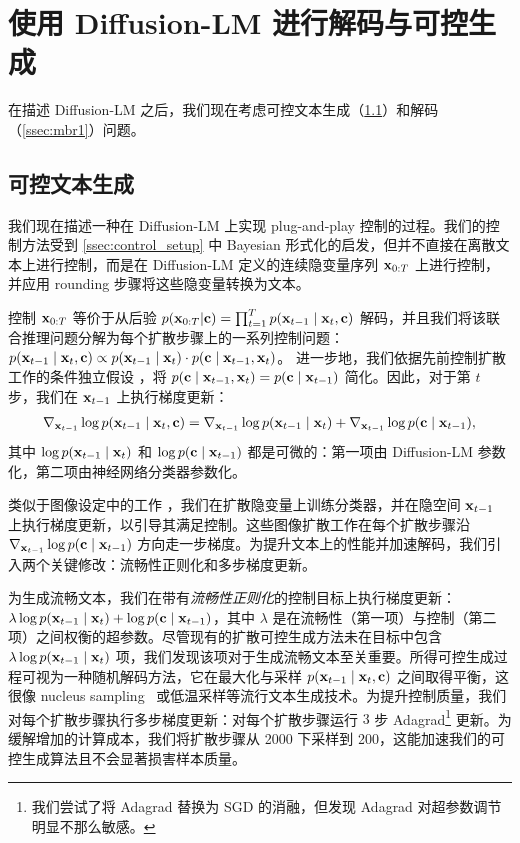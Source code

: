\section{使用 Diffusion-LM 进行解码与可控生成}
\label{sec:decode}
在描述 Diffusion-LM 之后，我们现在考虑可控文本生成（\cref{ssec:control_text}）和解码（\cref{ssec:mbr1}）问题。


\subsection{可控文本生成}
\label{ssec:control_text}
我们现在描述一种在 Diffusion-LM 上实现 plug-and-play 控制的过程。我们的控制方法受到 \cref{ssec:control_setup} 中 Bayesian 形式化的启发，但并不直接在离散文本上进行控制，而是在 Diffusion-LM 定义的连续隐变量序列 $\mathbf{x}_{0:T}$ 上进行控制，并应用 rounding 步骤将这些隐变量转换为文本。

控制 $\mathbf{x}_{0:T}$ 等价于从后验 $p(\mathbf{x}_{0:T} | \mathbf{c}) = \prod_{t=1}^T p(\mathbf{x}_{t-1} \mid \mathbf{x}_{t}, \mathbf{c})$ 解码，并且我们将该联合推理问题分解为每个扩散步骤上的一系列控制问题：$p(\mathbf{x}_{t-1} \mid \mathbf{x}_{t}, \mathbf{c}) \propto p(\mathbf{x}_{t-1} \mid \mathbf{x}_{t}) \cdot p(\mathbf{c} \mid \mathbf{x}_{t-1}, \mathbf{x}_{t})$。
进一步地，我们依据先前控制扩散工作的条件独立假设 \cite{song2021scorebased}，将 $p(\mathbf{c} \mid \mathbf{x}_{t-1}, \mathbf{x}_{t})=p(\mathbf{c} \mid \mathbf{x}_{t-1})$ 简化。因此，对于第 $t$ 步，我们在 $\mathbf{x}_{t-1}$ 上执行梯度更新：
\begin{align*}
    \nabla_{\mathbf{x}_{t-1}} \log p(\mathbf{x}_{t-1} \mid \mathbf{x}_{t}, \mathbf{c}) = \nabla_{\mathbf{x}_{t-1}} \log p(\mathbf{x}_{t-1} \mid \mathbf{x}_{t}) + \nabla_{\mathbf{x}_{t-1}}  \log  p(\mathbf{c} \mid \mathbf{x}_{t-1}),
\end{align*}
其中 $\log p(\mathbf{x}_{t-1} \mid \mathbf{x}_{t})$ 和 $\log p(\mathbf{c} \mid \mathbf{x}_{t-1})$ 都是可微的：第一项由 Diffusion-LM 参数化，第二项由神经网络分类器参数化。


类似于图像设定中的工作 \cite{dhariwal2021diffusion,song2021scorebased}，我们在扩散隐变量上训练分类器，并在隐空间 $\mathbf{x}_{t-1}$ 上执行梯度更新，以引导其满足控制。这些图像扩散工作在每个扩散步骤沿 $\nabla_{ \mathbf{x}_{t-1}} \log  p(\mathbf{c} \mid \mathbf{x}_{t-1})$ 方向走一步梯度。为提升文本上的性能并加速解码，我们引入两个关键修改：流畅性正则化和多步梯度更新。




为生成流畅文本，我们在带有\emph{流畅性正则化}的控制目标上执行梯度更新：$ \lambda \log p(\mathbf{x}_{t-1} \mid \mathbf{x}_{t}) + \log p(\mathbf{c} \mid \mathbf{x}_{t-1})$，其中 $\lambda$ 是在流畅性（第一项）与控制（第二项）之间权衡的超参数。尽管现有的扩散可控生成方法未在目标中包含 $\lambda \log p(\mathbf{x}_{t-1} \mid \mathbf{x}_{t})$ 项，我们发现该项对于生成流畅文本至关重要。所得可控生成过程可视为一种随机解码方法，它在最大化与采样 $p(\mathbf{x}_{t-1} \mid \mathbf{x}_{t}, \mathbf{c})$ 之间取得平衡，这很像 nucleus sampling~\cite{Holtzman2020Nucleus} 或低温采样等流行文本生成技术。为提升控制质量，我们对每个扩散步骤执行多步梯度更新：对每个扩散步骤运行 $3$ 步 Adagrad\footnote{我们尝试了将 Adagrad 替换为 SGD 的消融，但发现 Adagrad 对超参数调节明显不那么敏感。} \cite{Duchi2010AdaptiveSM} 更新。为缓解增加的计算成本，我们将扩散步骤从 2000 下采样到 200，这能加速我们的可控生成算法且不会显著损害样本质量。



